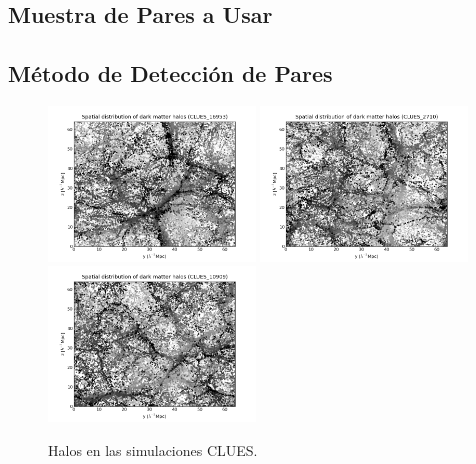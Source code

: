 	
	\subsection{Muestra de Pares a Usar}
	\label{subsec:SampleOfPairsToUse}
	
	
	\subsection{Método de Detección de Pares}
	\label{subsec:PairFinderMethod}






\begin{figure}[htbp]
	\centering
	\includegraphics[width=0.49\textwidth]
	{./figures/3_nbody_simulations/Halos_Spatial_Distribution(CLUES_16953).png}
	\includegraphics[width=0.49\textwidth]
	{./figures/3_nbody_simulations/Halos_Spatial_Distribution(CLUES_2710).png}
	\includegraphics[width=0.49\textwidth]
	{./figures/3_nbody_simulations/Halos_Spatial_Distribution(CLUES_10909).png}

	\caption{\small{Halos en las simulaciones CLUES.}}
	
	\label{fig:CLUES}
\end{figure}
